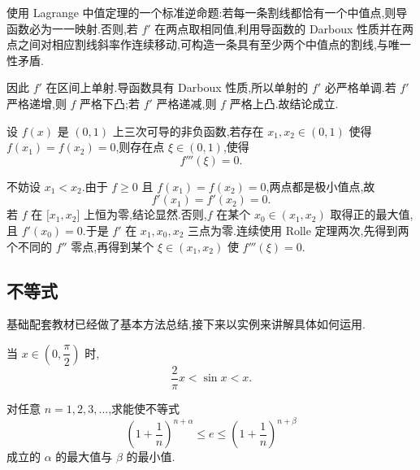 \begin{solution}
    使用 Lagrange 中值定理的一个标准逆命题:若每一条割线都恰有一个中值点,则导函数必为一一映射.否则,若 $f'$ 在两点取相同值,利用导函数的 Darboux 性质并在两点之间对相应割线斜率作连续移动,可构造一条具有至少两个中值点的割线,与唯一性矛盾.

    因此 $f'$ 在区间上单射.导函数具有 Darboux 性质,所以单射的 $f'$ 必严格单调.若 $f'$ 严格递增,则 $f$ 严格下凸;若 $f'$ 严格递减,则 $f$ 严格上凸.故结论成立.
\end{solution}

\begin{example}
    设 $f(x)$ 是 $(0,1)$ 上三次可导的非负函数,若存在 $x_1,x_2\in(0,1)$ 使得 $f(x_1)=f(x_2)=0$,则存在点 $\xi\in(0,1)$,使得
    \[
        f'''(\xi)=0.
    \]
\end{example}
\exampleblank

\begin{solution}
    不妨设 $x_1<x_2$.由于 $f\geq0$ 且 $f(x_1)=f(x_2)=0$,两点都是极小值点,故
    \[
        f'(x_1)=f'(x_2)=0.
    \]
    若 $f$ 在 $\lbrack x_1,x_2\rbrack$ 上恒为零,结论显然.否则,$f$ 在某个 $x_0\in(x_1,x_2)$ 取得正的最大值,且 $f'(x_0)=0$.于是 $f'$ 在 $x_1,x_0,x_2$ 三点为零.连续使用 Rolle 定理两次,先得到两个不同的 $f''$ 零点,再得到某个 $\xi\in(x_1,x_2)$ 使 $f'''(\xi)=0$.
\end{solution}



\subsection{不等式}

基础配套教材已经做了基本方法总结,接下来以实例来讲解具体如何运用.




\begin{proposition}[\marktwostar]
    当 $x\in\left(0,\dfrac{\pi}{2}\right)$ 时,
    \[
        \dfrac{2}{\pi}x<\sin x<x.
    \]
\end{proposition}

\begin{example}
    对任意 $n=1,2,3,\ldots$,求能使不等式
    \[
        \left(1+\dfrac{1}{n}\right)^{n+\alpha}
        \leq e
        \leq\left(1+\dfrac{1}{n}\right)^{n+\beta}
    \]
    成立的 $\alpha$ 的最大值与 $\beta$ 的最小值.
\end{example}
\exampleblank


